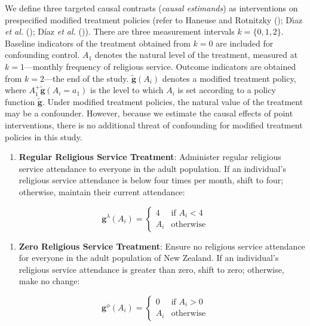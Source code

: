 \documentclass[
  single column]{article}
\providecommand{\tightlist}{%
  \setlength{\itemsep}{0pt}\setlength{\parskip}{0pt}}\usepackage{longtable,booktabs,array}
\begin{document}
We define three targeted causal contrasts (\emph{causal estimands}) as
interventions on prespecified modified treatment policies (refer to
Haneuse and Rotnitzky (); Dı́az
\emph{et al.} (); Díaz
\emph{et al.} ()). There are three
measurement intervals \(k = \{0,1,2\}\). Baseline indicators of the
treatment obtained from \(k = 0\) are included for confounding control.
\(A_1\) denotes the natural level of the treatment, measured at
\(k = 1\)---monthly frequency of religious service. Outcome indicators
are obtained from \(k = 2\)---the end of the study.
\(\mathbf{\tilde{g}}(A_i)\) denotes a modified treatment policy, where
\(A^+_1\mathbf{\tilde{g}}(A_i = a_1)\) is the level to which \(A_i\) is
set according to a policy function \(\mathbf{\tilde{g}}\). Under
modified treatment policies, the natural value of the treatment may be a
confounder. However, because we estimate the causal effects of point
interventions, there is no additional threat of confounding for modified
treatment policies in this study.

\begin{enumerate}
\def\labelenumi{\arabic{enumi}.}
\tightlist
\item
  \textbf{Regular Religious Service Treatment}: Administer regular
  religious service attendance to everyone in the adult population. If
  an individual's religious service attendance is below four times per
  month, shift to four; otherwise, maintain their current attendance:
\end{enumerate}

\[
\mathbf{g}^\lambda (A_i) = \begin{cases} 
4 & \text{if } A_i < 4 \\ 
A_i & \text{otherwise} 
\end{cases}
\]

\begin{enumerate}
\def\labelenumi{\arabic{enumi}.}
\setcounter{enumi}{1}
\tightlist
\item
  \textbf{Zero Religious Service Treatment}: Ensure no religious service
  attendance for everyone in the adult population of New Zealand. If an
  individual's religious service attendance is greater than zero, shift
  to zero; otherwise, make no change:
\end{enumerate}

\[
\mathbf{g}^\phi (A_i) = \begin{cases} 
0 & \text{if } A_i > 0 \\ 
A_i & \text{otherwise} 
\end{cases}
\]
\end{document}
